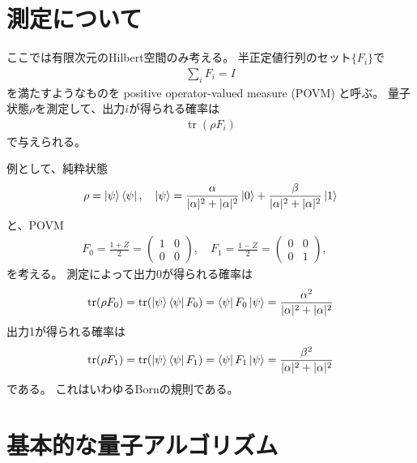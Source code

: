 \documentclass[]{ltjsarticle}
\DeclareMathOperator{\tr}{tr}
\begin{document}
\section{測定について}
ここでは有限次元のHilbert空間のみ考える。
半正定値行列のセット$\{F_i\}$で
\begin{align}
    \sum_i F_i = I
\end{align}
を満たすようなものを
positive operator-valued measure (POVM)
と呼ぶ。
量子状態$\rho$を測定して、出力$i$が得られる確率は
\begin{align}
    \tr(\rho F_i)    
\end{align}
で与えられる。

例として、純粋状態
\begin{align}
    \rho = \ket{\psi}\bra{\psi}, \quad 
    \ket{\psi} 
    =
    \frac{\alpha}{|\alpha|^2+|\alpha|^2} 
    \ket{0}   
    +
    \frac{\beta}{|\alpha|^2+|\alpha|^2}
    \ket{1}   
\end{align}
と、POVM
\begin{align}
    F_0 = \frac{1 + Z}{2}
    = \begin{pmatrix}
        1 & 0 \\ 0 & 0
    \end{pmatrix}, \quad 
    F_1 = \frac{1 - Z}{2} 
    = \begin{pmatrix}
        0 & 0 \\ 0 & 1
    \end{pmatrix}, \quad 
\end{align}
を考える。
測定によって出力0が得られる確率は
\begin{align}
    \tr(\rho F_0)
    =
    \tr(\ket{\psi}\bra{\psi} F_0)
    =
    \bra{\psi}F_0\ket{\psi}
    =
    \frac{\alpha^2}{|\alpha|^2+|\alpha|^2}
\end{align}
出力1が得られる確率は
\begin{align}
    \tr(\rho F_1)
    =
    \tr(\ket{\psi}\bra{\psi} F_1)
    =
    \bra{\psi}F_1\ket{\psi}
    =
    \frac{\beta^2}{|\alpha|^2+|\alpha|^2}
\end{align}
である。
これはいわゆるBornの規則である。


\section{基本的な量子アルゴリズム}
\end{document}

